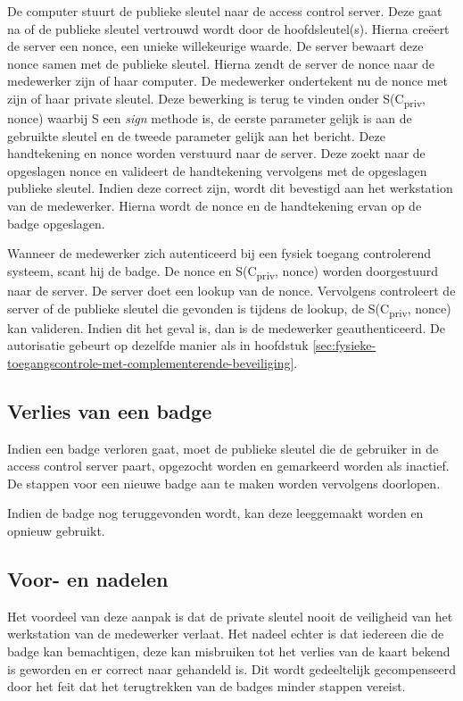 De computer stuurt de publieke sleutel naar de access control server. Deze gaat
na of de publieke sleutel vertrouwd wordt door de hoofdsleutel(s). Hierna
creëert de server een nonce, een unieke willekeurige waarde. De server bewaart
deze nonce samen met de publieke sleutel. Hierna zendt de server de nonce naar
de medewerker zijn of haar computer. De medewerker ondertekent nu de nonce met
zijn of haar private sleutel. Deze bewerking is terug te vinden onder
S(C\textsubscript{priv}, nonce) waarbij S een \textit{sign} methode is, de
eerste parameter gelijk is aan de gebruikte sleutel en de tweede parameter
gelijk aan het bericht. Deze handtekening en nonce worden verstuurd naar de
server. Deze zoekt naar de opgeslagen nonce en valideert de handtekening
vervolgens met de opgeslagen publieke sleutel. Indien deze correct zijn, wordt
dit bevestigd aan het werkstation van de medewerker. Hierna wordt de nonce en de
handtekening ervan op de badge opgeslagen.

Wanneer de medewerker zich autenticeerd bij een fysiek toegang controlerend
systeem, scant hij de badge. De nonce en S(C\textsubscript{priv}, nonce) worden
doorgestuurd naar de server. De server doet een lookup van de nonce. Vervolgens
controleert de server of de publieke sleutel die gevonden is tijdens de lookup,
de S(C\textsubscript{priv}, nonce) kan valideren. Indien dit het geval is, dan
is de medewerker geauthenticeerd. De autorisatie gebeurt op dezelfde manier als
in hoofdstuk
\ref{sec:fysieke-toegangscontrole-met-complementerende-beveiliging}.

\subsection{Verlies van een badge}

Indien een badge verloren gaat, moet de publieke sleutel die de gebruiker in de
access control server paart, opgezocht worden en gemarkeerd worden als inactief.
De stappen voor een nieuwe badge aan te maken worden vervolgens doorlopen.

Indien de badge nog teruggevonden wordt, kan deze leeggemaakt worden en opnieuw
gebruikt.

\subsection{Voor- en nadelen}
Het voordeel van deze aanpak is dat de private sleutel nooit de veiligheid van
het werkstation van de medewerker verlaat. Het nadeel echter is dat iedereen die
de badge kan bemachtigen, deze kan misbruiken tot het verlies van de kaart
bekend is geworden en er correct naar gehandeld is. Dit wordt gedeeltelijk
gecompenseerd door het feit dat het terugtrekken van de badges minder stappen
vereist.

